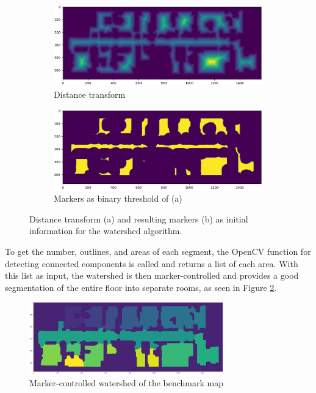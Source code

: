 \begin{figure}[h]
    \captionsetup[subfigure]{justification=centering}
    \centering
    \begin{subfigure}{.5\textwidth}
      \centering
      \includegraphics[width=\textwidth]{figures/50_implementation/ryu_distance_transform.png}
      \caption{Distance transform}
    \end{subfigure}%
    \begin{subfigure}{.5\textwidth}
      \centering
      \includegraphics[width=\textwidth]{figures/50_implementation/ryu_markers.png}
      \caption{Markers as binary threshold of (a)}
    \end{subfigure}
    \caption[Distance transform and resulting markers]{Distance transform (a) and resulting markers (b) as initial information for the watershed algorithm.}
    \label{fig:distance_transform}
\end{figure}

To get the number, outlines, and areas of each segment, the OpenCV function for detecting connected components is called and returns a list of each area. With this list as input, the watershed is then marker-controlled and provides a good segmentation of the entire floor into separate rooms, as seen in Figure \ref{fig:watershed}.

\begin{figure}[h]
    \centering\captionsetup{justification=centering}
    \includegraphics[width=0.75\textwidth]{figures/50_implementation/ryu_watershed.png}
    \caption[Marker-controlled watershed of the benchmark map]{Marker-controlled watershed of the benchmark map}
    \label{fig:watershed}
\end{figure}

